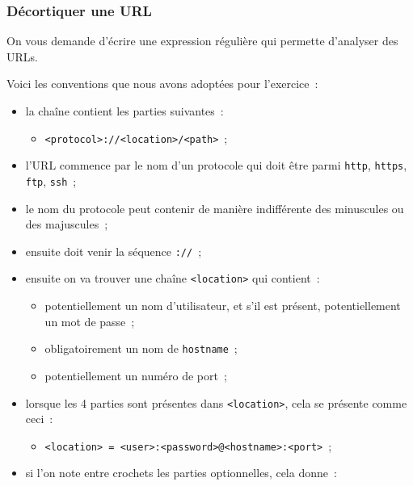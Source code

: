     \hypertarget{duxe9cortiquer-une-url}{%
\subsubsection{Décortiquer une URL}\label{duxe9cortiquer-une-url}}

    On vous demande d'écrire une expression régulière qui permette
d'analyser des URLs.

Voici les conventions que nous avons adoptées pour l'exercice~:

\begin{itemize}
\tightlist
\item
  la chaîne contient les parties suivantes~:

  \begin{itemize}
  \tightlist
  \item
    \texttt{\textless{}protocol\textgreater{}://\textless{}location\textgreater{}/\textless{}path\textgreater{}}~;
  \end{itemize}
\item
  l'URL commence par le nom d'un protocole qui doit être parmi
  \texttt{http}, \texttt{https}, \texttt{ftp}, \texttt{ssh}~;
\item
  le nom du protocole peut contenir de manière indifférente des
  minuscules ou des majuscules~;
\item
  ensuite doit venir la séquence \texttt{://}~;
\item
  ensuite on va trouver une chaîne
  \texttt{\textless{}location\textgreater{}} qui contient~:

  \begin{itemize}
  \tightlist
  \item
    potentiellement un nom d'utilisateur, et s'il est présent,
    potentiellement un mot de passe~;
  \item
    obligatoirement un nom de \texttt{hostname}~;
  \item
    potentiellement un numéro de port~;
  \end{itemize}
\item
  lorsque les 4 parties sont présentes dans
  \texttt{\textless{}location\textgreater{}}, cela se présente comme
  ceci~:

  \begin{itemize}
  \tightlist
  \item
    \texttt{\textless{}location\textgreater{}\ =\ \textless{}user\textgreater{}:\textless{}password\textgreater{}@\textless{}hostname\textgreater{}:\textless{}port\textgreater{}}~;
  \end{itemize}
\item
  si l'on note entre crochets les parties optionnelles, cela donne~:


\end{itemize}
